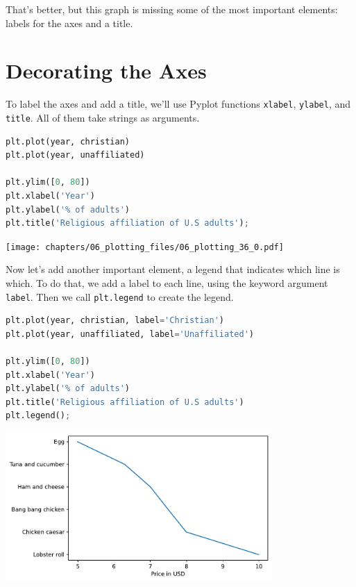That's better, but this graph is missing some of the most important
elements: labels for the axes and a title.

\hypertarget{decorating-the-axes}{%
\section{Decorating the Axes}\label{decorating-the-axes}}

To label the axes and add a title, we'll use Pyplot functions
\passthrough{\lstinline!xlabel!}, \passthrough{\lstinline!ylabel!}, and
\passthrough{\lstinline!title!}. All of them take strings as arguments.

\begin{lstlisting}[language=Python,style=source]
plt.plot(year, christian)
plt.plot(year, unaffiliated)

plt.ylim([0, 80])
plt.xlabel('Year')
plt.ylabel('% of adults')
plt.title('Religious affiliation of U.S adults');
\end{lstlisting}

\begin{center}
\texttt{[image: chapters/06\_plotting\_files/06\_plotting\_36\_0.pdf]}
\end{center}

Now let's add another important element, a legend that indicates which
line is which. To do that, we add a label to each line, using the
keyword argument \passthrough{\lstinline!label!}. Then we call
\passthrough{\lstinline!plt.legend!} to create the legend.

\begin{lstlisting}[language=Python,style=source]
plt.plot(year, christian, label='Christian')
plt.plot(year, unaffiliated, label='Unaffiliated')

plt.ylim([0, 80])
plt.xlabel('Year')
plt.ylabel('% of adults')
plt.title('Religious affiliation of U.S adults')
plt.legend();
\end{lstlisting}

\begin{center}
\includegraphics[width=4in]{chapters/06_plotting_files/06_plotting_38_0.pdf}
\end{center}


